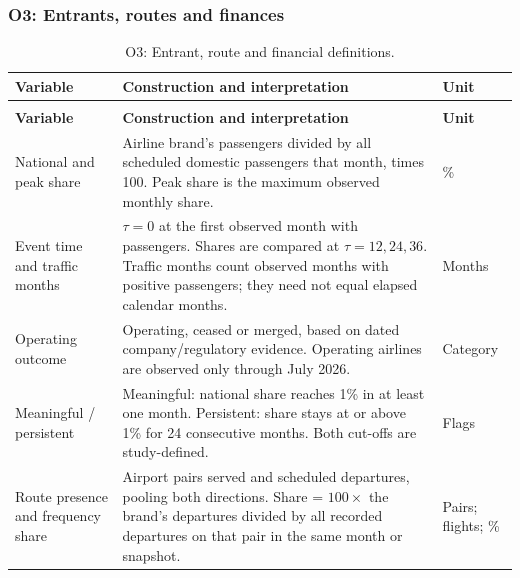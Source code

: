 \subsubsection{O3: Entrants, routes and finances}
\label{app:o3-definitions}
\begingroup
\color{black}\small{}
\renewcommand{\arraystretch}{1.2}
\setlength{\tabcolsep}{5pt}
\captionsetup{font=small,labelfont=bf,justification=centering,singlelinecheck=false,skip=6pt}
\begin{longtable}{|>{\raggedright\arraybackslash}p{}|>{\raggedright\arraybackslash}p{}|>{\raggedright\arraybackslash}p{}|}
\caption{O3: Entrant, route and financial definitions.}\label{tab:team-o3-variables}\\
\hline
\textbf{Variable} & \textbf{Construction and interpretation} & \textbf{Unit} \\
\hline
\endfirsthead
\multicolumn{3}{c}{\small Table~\thetable\ (continued)}\\[4pt]
\hline
\textbf{Variable} & \textbf{Construction and interpretation} & \textbf{Unit} \\
\hline
\endhead
National and peak share & Airline brand's passengers divided by all scheduled domestic passengers that month, times 100. Peak share is the maximum observed monthly share. & \% \\
\hline
Event time and traffic months & $\tau=0$ at the first observed month with passengers. Shares are compared at $\tau=12,24,36$. Traffic months count observed months with positive passengers; they need not equal elapsed calendar months. & Months \\
\hline
Operating outcome & Operating, ceased or merged, based on dated company/regulatory evidence. Operating airlines are observed only through July 2026. & Category \\
\hline
Meaningful / persistent & Meaningful: national share reaches 1\% in at least one month. Persistent: share stays at or above 1\% for 24 consecutive months. Both cut-offs are study-defined. & Flags \\
\hline
Route presence and frequency share & Airport pairs served and scheduled departures, pooling both directions. Share = $100\times$ the brand's departures divided by all recorded departures on that pair in the same month or snapshot. & Pairs; flights; \% \\

\end{longtable}
